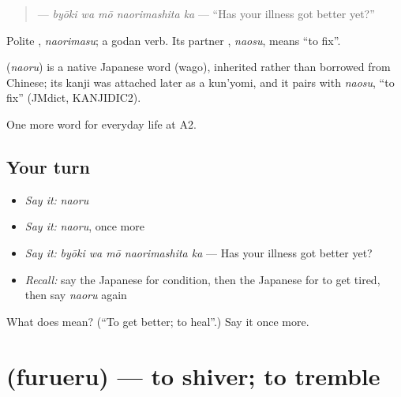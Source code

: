 \begin{quote}
\textbf{  } — \emph{byōki wa mō naorimashita ka} — \textquotedblleft{}Has your illness got better yet?\textquotedblright{}
\end{quote}

Polite \textbf{}, \emph{naorimasu}; a godan verb. Its partner \textbf{}, \emph{naosu}, means \textquotedblleft{}to fix\textquotedblright{}.

\begin{cousinweb}
\textbf{} (\emph{naoru}) is a native Japanese word (wago), inherited rather than borrowed from Chinese; its kanji was attached later as a kun'yomi, and it pairs with \emph{naosu}, \textquotedblleft{}to fix\textquotedblright{} (JMdict, KANJIDIC2).
\end{cousinweb}

\begin{grammarlens}[title={What you've built}]
One more word for everyday life at A2.
\end{grammarlens}

\subsection*{Your turn}
\begin{itemize}
\raggedright
  \item \emph{Say it:} \emph{naoru}
  \item \emph{Say it:} \emph{naoru}, once more
  \item \emph{Say it:} \emph{byōki wa mō naorimashita ka} — Has your illness got better yet?
  \item \emph{Recall:} say the Japanese for condition, then the Japanese for to get tired, then say \emph{naoru} again
\end{itemize}

\begin{tcolorbox}[breakable,colback=teal!4,colframe=teal!35!black,title={Before you move on}]
What does  mean? (\textquotedblleft{}To get better; to heal\textquotedblright{}.) Say it once more.
\end{tcolorbox}
\section[\texorpdfstring{\ja{ふるえる} (furueru)}{ふるえる (furueru)}]{ (furueru) — to shiver; to tremble}

\label{lesson:JA-C216-furueru}



